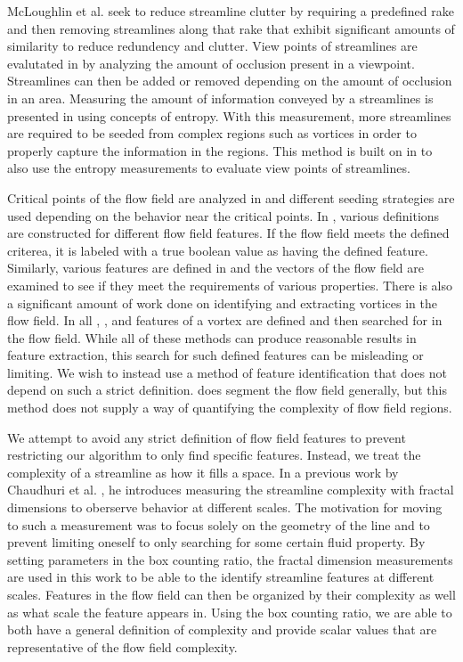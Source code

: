 \documentclass[journal]{vgtc}                %
\begin{document}
McLoughlin et al. \cite{mcloughlin} seek to reduce streamline clutter by requiring a predefined rake and then removing streamlines along that rake that exhibit significant amounts of similarity to reduce redundency and clutter.
View points of streamlines are evalutated in \cite{marchesin} by analyzing the amount of occlusion present in a viewpoint.
Streamlines can then be added or removed depending on the amount of occlusion in an area.
Measuring the amount of information conveyed by a streamlines is presented in \cite{shen} using concepts of entropy.
With this measurement, more streamlines are required to be seeded from complex regions such as vortices in order to properly capture the information in the regions.
This method is built on in \cite{lee} to also use the entropy measurements to evaluate view points of streamlines.

Critical points of the flow field are analyzed in \cite{ye} and different seeding strategies are used depending on the behavior near the critical points.
In \cite{salzbrunn}, various definitions are constructed for different flow field features.
If the flow field meets the defined criterea, it is labeled with a true boolean value as having the defined feature.
Similarly, various features are defined in \cite{heiberg} and the vectors of the flow field are examined to see if they meet the requirements of various properties.
There is also a significant amount of work done on identifying and extracting vortices in the flow field.
In all \cite{sadarjoen1999}, \cite{sadarjoen1998}, and \cite{zhong} features of a vortex are defined and then searched for in the flow field.
While all of these methods can produce reasonable results in feature extraction, this search for such defined features can be misleading or limiting.
We wish to instead use a method of feature identification that does not depend on such a strict definition.
\cite{mahrous} does segment the flow field generally, but this method does not supply a way of quantifying the complexity of flow field regions.

We attempt to avoid any strict definition of flow field features to prevent restricting our algorithm to only find specific features. Instead, we treat the complexity of a streamline as how it fills a space. In a previous work by Chaudhuri et al. \cite{chaudhuri}, he introduces measuring the streamline complexity with fractal dimensions to oberserve behavior at different scales.
The motivation for moving to such a measurement was to focus solely on the geometry of the line and to prevent limiting oneself to only searching for some certain fluid property.
By setting parameters in the box counting ratio, the fractal dimension measurements are used in this work to be able to the identify streamline features at different scales.
Features in the flow field can then be organized by their complexity as well as what scale the feature appears in.
Using the box counting ratio, we are able to both have a general definition of complexity and provide scalar values that are representative of the flow field complexity.
\end{document}
